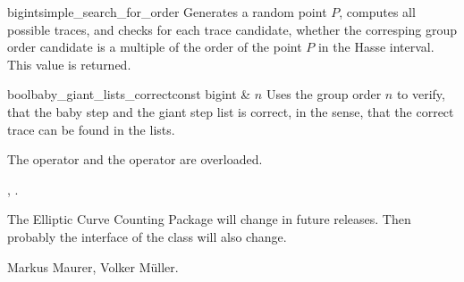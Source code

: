 \begin{fcode}{bigint}{simple_search_for_order}{}
  Generates a random point $P$, computes all possible traces, and checks for each trace
  candidate, whether the corresping group order candidate is a multiple of the order of the
  point $P$ in the Hasse interval.  This value is returned.
\end{fcode}

\begin{fcode}{bool}{baby_giant_lists_correct}{const bigint & $n$}
  Uses the group order $n$ to verify, that the baby step and the giant step list is correct, in
  the sense, that the correct trace can be found in the lists.
\end{fcode}



\IO

The  operator \code{>>} and the  operator \code{<<} are
overloaded.



\SEEALSO

, .



\NOTES

The Elliptic Curve Counting Package will change in future releases.  Then
probably the interface of the class  will also change.



\AUTHOR

Markus Maurer, Volker M\"uller.
